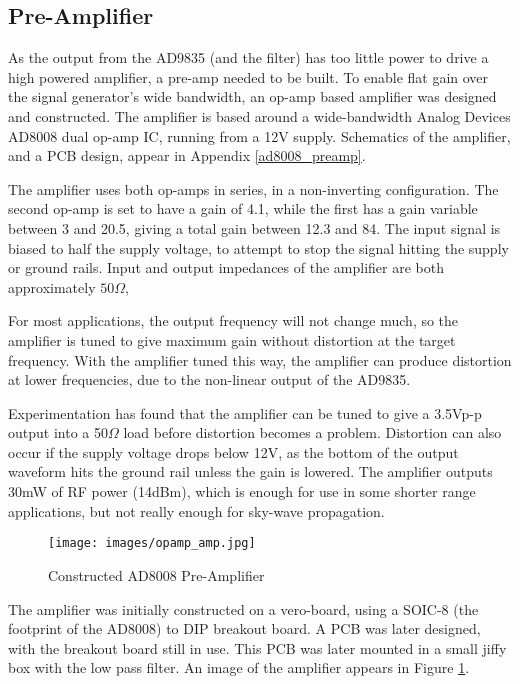 \documentclass[a4paper,12pt]{article}
\begin{document}
\subsection{Pre-Amplifier}

As the output from the AD9835 (and the filter) has too little power to drive a high powered amplifier, a pre-amp needed to be built. To enable flat gain over the signal generator's wide bandwidth, an op-amp based amplifier was designed and constructed. The amplifier is based around a wide-bandwidth Analog Devices AD8008 dual op-amp IC, running from a 12V supply. Schematics of the amplifier, and a PCB design, appear in Appendix \ref{ad8008_preamp}.

The amplifier uses both op-amps in series, in a non-inverting configuration. The second op-amp is set to have a gain of 4.1, while the first has a gain variable between 3 and 20.5, giving a total gain between 12.3 and 84. The input signal is biased to half the supply voltage, to attempt to stop the signal hitting the supply or ground rails. Input and output impedances of the amplifier are both approximately $50\Omega$, 

For most applications, the output frequency will not change much, so the amplifier is tuned to give maximum gain without distortion at the target frequency. With the amplifier tuned this way, the amplifier can produce distortion at lower frequencies, due to the non-linear output of the AD9835. 

Experimentation has found that the amplifier can be tuned to give a 3.5Vp-p output into a 50$\Omega$ load before distortion becomes a problem. Distortion can also occur if the supply voltage drops below 12V, as the bottom of the output waveform hits the ground rail unless the gain is lowered. The amplifier outputs 30mW of RF power (14dBm), which is enough for use in some shorter range applications, but not really enough for sky-wave propagation.

\begin{figure}[h]
  \begin{center}
    \texttt{[image: images/opamp\_amp.jpg]}
  \end{center}
  \caption{Constructed AD8008 Pre-Amplifier}
  \label{fig:ad8008}
\end{figure}

The amplifier was initially constructed on a vero-board, using a SOIC-8 (the footprint of the AD8008) to DIP breakout board. A PCB was later designed, with the breakout board still in use. This PCB was later mounted in a small jiffy box with the low pass filter. An image of the amplifier appears in Figure \ref{fig:ad8008}.
\end{document}
